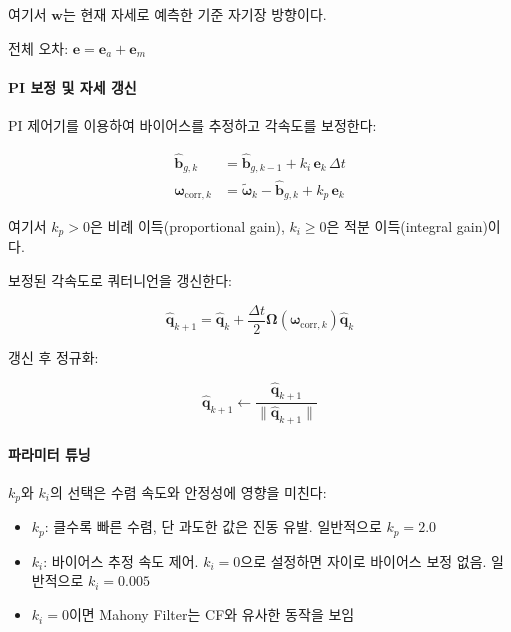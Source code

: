 \noindent 여기서 $\mathbf{w}$는 현재 자세로 예측한 기준 자기장 방향이다.

전체 오차: $\mathbf{e} = \mathbf{e}_a + \mathbf{e}_m$

\paragraph{PI 보정 및 자세 갱신}

PI 제어기를 이용하여 바이어스를 추정하고 각속도를 보정한다:

\begin{align}
    \hat{\mathbf{b}}_{g,k} &= \hat{\mathbf{b}}_{g,k-1} + k_i\,\mathbf{e}_k\,\Delta t \label{eq:mahony_bias_update} \\
    \boldsymbol{\omega}_{\text{corr},k} &= \tilde{\boldsymbol{\omega}}_k - \hat{\mathbf{b}}_{g,k} + k_p\,\mathbf{e}_k \label{eq:mahony_omega_corr}
\end{align}

\noindent 여기서 $k_p > 0$은 비례 이득(proportional gain),
$k_i \geq 0$은 적분 이득(integral gain)이다.

보정된 각속도로 쿼터니언을 갱신한다:

\begin{equation}
    \hat{\mathbf{q}}_{k+1} = \hat{\mathbf{q}}_k + \frac{\Delta t}{2}\boldsymbol{\Omega}(\boldsymbol{\omega}_{\text{corr},k})\hat{\mathbf{q}}_k
    \label{eq:mahony_quat_update}
\end{equation}

갱신 후 정규화:

\begin{equation}
    \hat{\mathbf{q}}_{k+1} \leftarrow \frac{\hat{\mathbf{q}}_{k+1}}{\|\hat{\mathbf{q}}_{k+1}\|}
    \label{eq:mahony_normalize}
\end{equation}

\paragraph{파라미터 튜닝}

$k_p$와 $k_i$의 선택은 수렴 속도와 안정성에 영향을 미친다:
\begin{itemize}
    \item $k_p$: 클수록 빠른 수렴, 단 과도한 값은 진동 유발. 일반적으로 $k_p = 2.0$
    \item $k_i$: 바이어스 추정 속도 제어. $k_i = 0$으로 설정하면 자이로 바이어스 보정 없음. 일반적으로 $k_i = 0.005$
    \item $k_i = 0$이면 Mahony Filter는 CF와 유사한 동작을 보임
\end{itemize}

